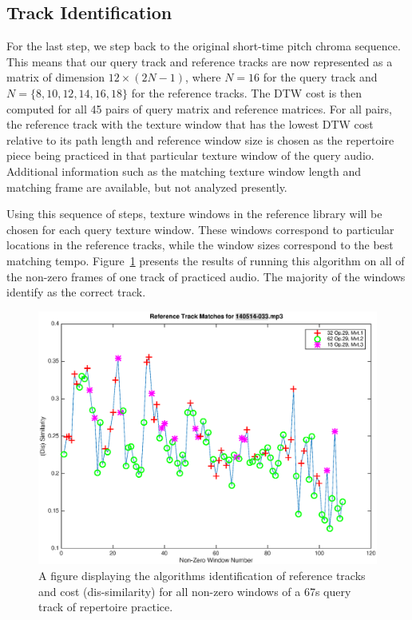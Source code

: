 \documentclass{article}
\begin{document}
\subsection{Track Identification}
For the last step, we step back to the original short-time pitch chroma sequence. This means that our query track and reference tracks are now represented as a matrix of dimension $12\times (2N-1)$, where $N=16$ for the query track and $N=\{8,10,12,14,16,18\}$ for the reference tracks.
%
The DTW cost is then computed for all 45 pairs of query matrix and reference matrices. For all pairs, the reference track with the texture window that has the lowest DTW cost relative to its path length and reference window size 
is chosen as the repertoire piece being practiced in that particular texture window of the query audio.  Additional information such as the matching texture window length and matching frame are available, but not analyzed presently. 

Using this sequence of steps, texture windows in the reference library will be chosen for each query texture window. These windows correspond to particular locations in the reference tracks, while the window sizes correspond to the best matching tempo. 
Figure~\ref{fig:140514-013} 
presents the results of running this algorithm on all of the non-zero frames of one track of practiced audio. The majority of the windows identify as the correct track.

\begin{figure}
\includegraphics[width=\linewidth]{figs/140514-033.eps}
\caption{A figure displaying the algorithms identification of reference tracks and cost (dis-similarity) for all non-zero windows of a 67s query track of repertoire practice.}
\label{fig:140514-013}
\end{figure}
\end{document}
